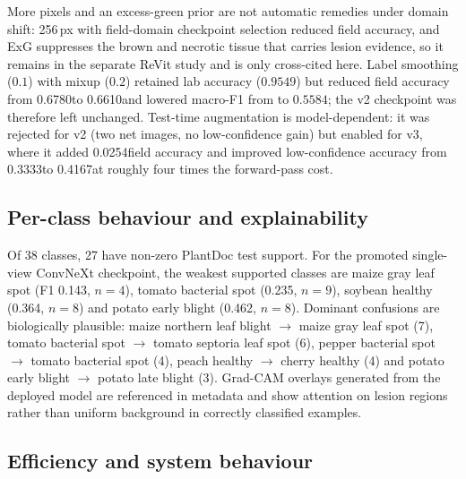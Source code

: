 \documentclass[journal,twocolumn,10pt]{IEEEtran}
\newcommand{\PDvtwo}{0.6780}
\newcommand{\RegField}{0.6610}
\newcommand{\DeltaTTA}{0.0254}
\newcommand{\LowConfSingle}{0.3333}
\newcommand{\LowConfTTA}{0.4167}
\begin{document}
More pixels and an excess-green prior are not automatic remedies under domain shift: 256\,px with
field-domain checkpoint selection reduced field accuracy, and ExG suppresses the brown and necrotic
tissue that carries lesion evidence, so it remains in the separate ReVit study and is only
cross-cited here. Label smoothing ($0.1$) with mixup ($0.2$) retained lab accuracy ($0.9549$) but
reduced field accuracy from \PDvtwo to \RegField and lowered macro-F1 from \FonePDvtwo to $0.5584$;
the v2 checkpoint was therefore left unchanged. Test-time augmentation is model-dependent: it was
rejected for v2 (two net images, no low-confidence gain) but enabled for v3, where it added
\DeltaTTA field accuracy and improved low-confidence accuracy from \LowConfSingle to \LowConfTTA at
roughly four times the forward-pass cost.

\subsection{Per-class behaviour and explainability}

Of 38 classes, 27 have non-zero PlantDoc test support. For the promoted single-view ConvNeXt
checkpoint, the weakest supported classes are maize gray leaf spot (F1 0.143, $n=4$), tomato
bacterial spot (0.235, $n=9$), soybean healthy (0.364, $n=8$) and potato early blight (0.462,
$n=8$). Dominant confusions are biologically plausible: maize northern leaf blight $\to$ maize gray
leaf spot (7), tomato bacterial spot $\to$ tomato septoria leaf spot (6), pepper bacterial spot
$\to$ tomato bacterial spot (4), peach healthy $\to$ cherry healthy (4) and potato early blight
$\to$ potato late blight (3). Grad-CAM overlays generated from the deployed model are referenced in
metadata and show attention on lesion regions rather than uniform background in correctly
classified examples.

\subsection{Efficiency and system behaviour}
\end{document}
